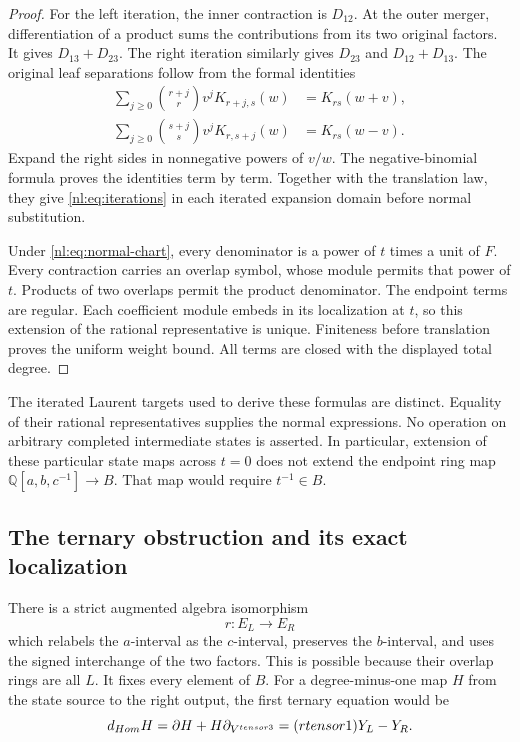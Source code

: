 \begin{proof}
For the left iteration, the inner contraction is \(D_{12}\).
At the outer merger, differentiation of a product sums the contributions
from its two original factors. It gives \(D_{13}+D_{23}\).
The right iteration similarly gives \(D_{23}\) and \(D_{12}+D_{13}\).
The original leaf separations follow from the formal identities
\begin{align*}
 \sum_{j\geq0}\binom{r+j}{r}v^jK_{r+j,s}(w)&=K_{rs}(w+v),\\
 \sum_{j\geq0}\binom{s+j}{s}v^jK_{r,s+j}(w)&=K_{rs}(w-v).
\end{align*}
Expand the right sides in nonnegative powers of \(v/w\).
The negative-binomial formula proves the identities term by term.
Together with the translation law, they give \eqref{nl:eq:iterations}
in each iterated expansion domain before normal substitution.

Under \eqref{nl:eq:normal-chart}, every denominator is a power of
\(t\) times a unit of \(F\). Every contraction carries an
overlap symbol, whose module permits that power of \(t\).
Products of two overlaps permit the product denominator.
The endpoint terms are regular. Each coefficient module embeds in
its localization at \(t\), so this extension of the rational representative
is unique. Finiteness before translation proves the uniform weight bound.
All terms are closed with the displayed total degree.
\end{proof}

The iterated Laurent targets used to derive these formulas are distinct.
Equality of their rational representatives supplies the normal expressions.
No operation on arbitrary completed intermediate states is asserted.
In particular, extension of these particular state maps across \(t=0\)
does not extend the endpoint ring map \(\mathbb Q[a,b,c^{-1}]\to B\).
That map would require \(t^{-1}\in B\).

\subsection{The ternary obstruction and its exact localization}

There is a strict augmented algebra isomorphism
\[
 r:E_L\longrightarrow E_R
\]
which relabels the \(a\)-interval as the \(c\)-interval, preserves
the \(b\)-interval, and uses the signed interchange of the two factors.
This is possible because their overlap rings are all \(L\).
It fixes every element of \(B\).
For a degree-minus-one map \(H\) from the state source to the
right output, the first ternary equation would be
\begin{equation}\label{nl:eq:ternary}
 d_{Hom}H=\partial H+H\partial_{V^{tensor3}}
                  =(rtensor1)Y_L-Y_R.
\end{equation}

